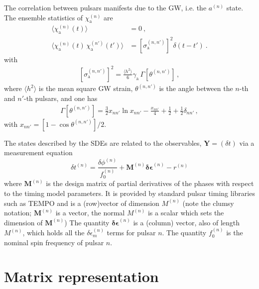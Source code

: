 \documentclass[]{scrartcl}
\begin{document}
The correlation between pulsars manifests due to the GW, i.e. the $a^{(n)}$ state. The ensemble statistics of $\chi_{\mathrm a}^{(n)}$ are
\begin{align}
	\langle \chi^{(n)}_{\mathrm a}(t) \rangle &= 0 \ , 	\label{eq:xieqn1} \\
	\langle \chi^{(n)}_{\mathrm a}(t) \, \chi^{(n')}_{\mathrm a}(t') \rangle &= \left[\sigma^{(n,n')}_{\mathrm a}\right]^2 \delta(t - t') \ .	\label{eq:xieqn2}
\end{align}
with
\begin{eqnarray}
	\left[\sigma^{(n,n')}_{\mathrm a}\right]^2 = \frac{\langle h^2\rangle}{6} \gamma_{\mathrm a} \, \Gamma \left[ \theta^{(n,n')} \right] \, , \label{eq:sigma_a_expression}
\end{eqnarray}
where $\langle h^2 \rangle$ is the mean square GW strain, $\theta^{(n,n')}$ is the angle between the $n$-th and $n'$-th pulsars, and one has
\begin{eqnarray}
	\Gamma\left[\theta^{(n,n')} \right] =  \frac{3}{2} x_{n n'} \ln x_{n n'}  -\frac{x_{n n'} }{4}+\frac{1}{2} + \frac{1}{2} \delta_{n n'}\label{eq:correlation} \, ,
\end{eqnarray}
with $x_{nn'} = \left[1 - \cos \theta^{(n,n')}\right]/2$. \newline 

The states described by the SDEs are related to the observables, $\boldsymbol{Y} = \left(\delta t \right) $ via a measurement equation
\begin{equation}
	\delta t^{(n)} = \frac{\delta \phi^{(n)}}{f_0^{(n)}} + \mathbf{M}^{(n)} \boldsymbol{\delta \epsilon}^{(n)} - r^{(n)}
\end{equation}
where $\mathbf{M}^{(n)}$ is the design matrix of partial derivatives of the phases with respect to the timing model parameters. It is provided by standard pulsar timing libraries such as TEMPO and is a (row)vector of dimension $M^{(n)}$ (note the clumsy notation; $\mathbf{M}^{(n)}$ is a vector, the normal $M^{(n)}$ is a scalar which sets the dimension of $\mathbf{M}^{(n)}$) 
The quantity $\boldsymbol{\delta \epsilon}^{(n)}$ is a (column) vector, also of length $M^{(n)}$, which holds all the $\delta \epsilon^{(n)}_{m}$ terms for pulsar $n$.
The quantity $f_0^{(n)}$ is the nominal spin frequency of pulsar $n$.



\section{Matrix representation}
\end{document}
